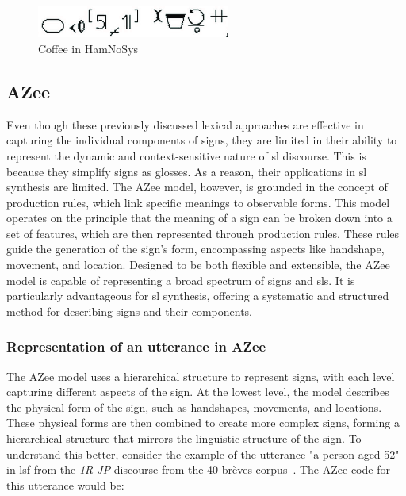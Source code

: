 \documentclass[../../main.tex]{subfiles}
\begin{document}
\begin{figure}[h]
  \centering \includegraphics[width = 2.5in]{chapters/background_work/images/hamnosys_coffee.png}
  \caption{Coffee in HamNoSys}
  \label{fig:hamnosys_coffee}
\end{figure}

\subsection{AZee}
\label{ch:background_work:sign_language_descriptions:azee}

Even though these previously discussed lexical approaches are effective in capturing the individual components of signs, they are limited in their ability to represent the dynamic and context-sensitive nature of \gls{sl} discourse. This is because they simplify signs as \gls{glosses}. As a reason, their applications in \gls{sl} synthesis are limited. The AZee model, however, is grounded in the concept of production rules, which link specific meanings to observable forms. This model operates on the principle that the meaning of a sign can be broken down into a set of features, which are then represented through production rules. These rules guide the generation of the sign's form, encompassing aspects like handshape, movement, and location. Designed to be both flexible and extensible, the AZee model is capable of representing a broad spectrum of signs and \gls{sl}s. It is particularly advantageous for \gls{sl} synthesis, offering a systematic and structured method for describing signs and their components.

\subsubsection{Representation of an \gls{utterance} in AZee}
\label{ch:background_work:sign_language_descriptions:azee:representation}

The AZee model uses a hierarchical structure to represent signs, with each level capturing different aspects of the sign. At the lowest level, the model describes the physical form of the sign, such as handshapes, movements, and locations. These physical forms are then combined to create more complex signs, forming a hierarchical structure that mirrors the linguistic structure of the sign. To understand this better, consider the example of the \gls{utterance} "a person aged 52" in \gls{lsf} from the \emph{1R-JP} discourse from the 40 brèves corpus~\cite{challant2022first}. The AZee code for this \gls{utterance} would be:
\end{document}
